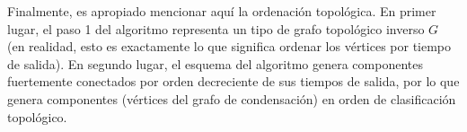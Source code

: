 Finalmente, es apropiado mencionar aquí la ordenación topológica. En primer lugar, el paso 1 del 
algoritmo representa un tipo de grafo topológico inverso $G$ (en realidad, esto es exactamente lo que 
significa ordenar los vértices por tiempo de salida). En segundo lugar, el esquema del algoritmo genera 
componentes fuertemente conectados por orden decreciente de sus tiempos de salida, por lo que genera 
componentes (vértices del grafo de condensación) en orden de clasificación topológico.
